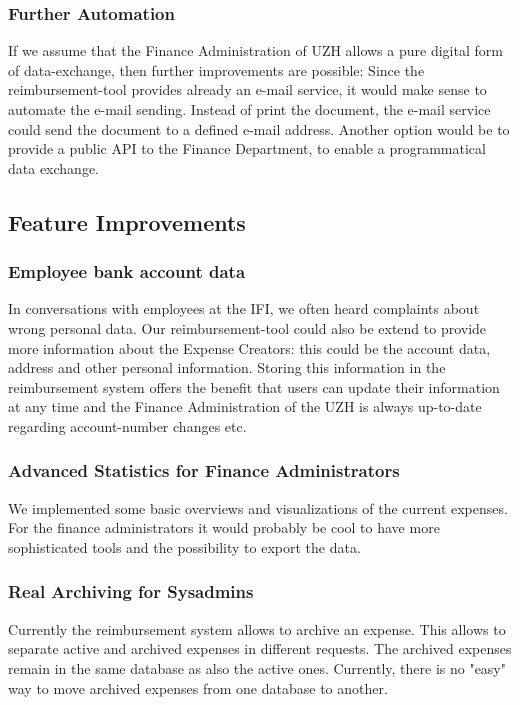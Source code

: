 \subsubsection{Further Automation}
If we assume that the Finance Administration of UZH allows a pure digital form of data-exchange, then further improvements are possible: Since the reimbursement-tool provides already an e-mail service, it would make sense to automate the e-mail sending. Instead of print the document, the e-mail service could send the document to a defined e-mail address. Another option would be to provide a public API to the Finance Department, to enable a programmatical data exchange.\par 

\subsection{Feature Improvements}
\subsubsection{Employee bank account data}In conversations with employees at the IFI, we often heard complaints about wrong personal data. Our reimbursement-tool could also be extend to provide more information about the Expense Creators: this could be the account data, address and other personal information. Storing this information in the reimbursement system offers the benefit that users can update their information at any time and the Finance Administration of the UZH is always up-to-date regarding account-number changes etc.

\subsubsection{Advanced Statistics for Finance Administrators } 
We implemented some basic overviews and visualizations of the current expenses. For the finance administrators it would probably be cool to have more sophisticated tools and the possibility to export the data.

\subsubsection{Real Archiving for Sysadmins} 
Currently the reimbursement system allows to archive an expense. This allows to separate active and archived expenses in different requests. The archived expenses remain in the same database as also the active ones. Currently, there is no "easy" way to move archived expenses from one database to another.
